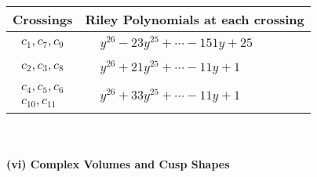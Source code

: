 \documentclass[1p]{elsarticle_modified}
\theoremstyle{definition}
\begin{document}
\begin{tabular}{m{50pt}|m{274pt}}
Crossings & \hspace{64pt}Riley Polynomials at each crossing \\
\hline $$\begin{aligned}c_{1},c_{7},c_{9}\end{aligned}$$&$\begin{aligned}
&y^{26}-23 y^{25}+\cdots-151 y+25
\end{aligned}$\\
\hline $$\begin{aligned}c_{2},c_{3},c_{8}\end{aligned}$$&$\begin{aligned}
&y^{26}+21 y^{25}+\cdots-11 y+1
\end{aligned}$\\
\hline $$\begin{aligned}c_{4},c_{5},c_{6}\\c_{10},c_{11}\end{aligned}$$&$\begin{aligned}
&y^{26}+33 y^{25}+\cdots-11 y+1
\end{aligned}$\\
\hline
\end{tabular}\\~\\
\newpage\flushleft \textbf{(vi) Complex Volumes and Cusp Shapes}
\end{document}
